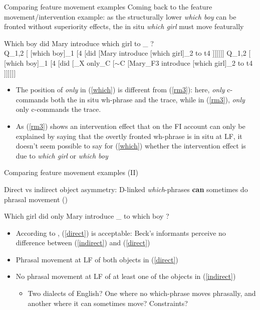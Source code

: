 \documentclass[11pt,final,hyperref={pdfpagelabels=false}]{beamer}
\begin{document}
\begin{frame}{Comparing feature movement examples}
Coming back to the feature movement/intervention example: as the structurally lower \textit{which boy} can be fronted without superiority effects, the in situ \textit{which girl} must move featurally

\begin{exe}
		\ex Which boy did Mary introduce which girl to \_ ?\\
		{\footnotesize{Q_{1,2} [ [which boy]_{1} [4 [did [Mary introduce [which girl]_{2} to t4 ]]]]]]}}
		{\scriptsize{Q_{1,2} [ [which boy]_{1} [4 [did [_{X} only_{C} [$\sim$C [Mary_{F3} introduce [which girl]_{2} to t4 ]]]]]]}}\label{which}
	\end{exe}

\begin{itemize} 
\item The position of \textit{only} in (\ref{which}) is different from (\ref{rm3}): here, \textit{only} c-commands both the in situ wh-phrase and the trace, while in (\ref{rm3}), \textit{only} only c-commands the trace.

\item As (\ref{rm3}) shows an intervention effect that on the FI account can only be explained by saying that the overtly fronted wh-phrase is in situ at LF, it doesn't seem possible to say for (\ref{which}) whether the intervention effect is due to \textit{which girl} or \textit{which boy}
\end{itemize}
\end{frame}


\begin{frame}{Comparing feature movement examples (II)}

Direct vs indirect object asymmetry: D-linked \textit{which}-phrases \textbf{can} sometimes do phrasal movement (\cite{Pes00}) 

\begin{exe}
		\label{indirect}
		\ex\label{direct} Which girl did only Mary introduce \_ to which boy ?
	\end{exe}

\begin{itemize} 
\item According to \cite{Pes00}, (\ref{direct}) is acceptable: Beck's informants perceive no difference between (\ref{indirect}) and (\ref{direct})
\item Phrasal movement at LF of both objects in (\ref{direct})
\item No phrasal movement at LF of at least one of the objects in (\ref{indirect})
    \begin{itemize}
    \item Two dialects of English? One where no which-phrase moves phrasally, and another where it can sometimes move? Constraints?
    \end{itemize}

\end{itemize}
\end{frame}
\end{document}
